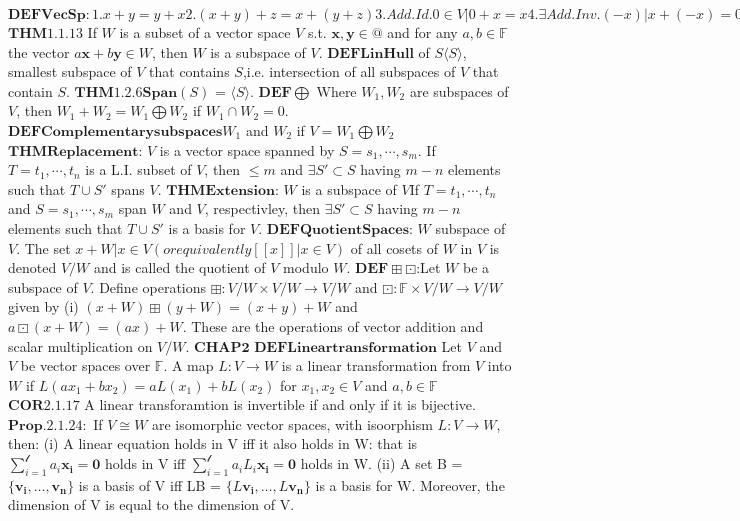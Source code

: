 \documentclass[8pt]{extarticle}
\theoremstyle{definition}
\begin{document}
{\small
$\mathbf{DEFVecSp}:1.x+y=y+x2.(x+y)+z = x+(y+z)3.Add.Id.0\in V | 0+x = x4. \exists Add.Inv. (-x) | x+(-x) = 0(5.) F.Dis.Law a(x+y) = ax + ay(6.) S.Dis.Law (a+b)(x) = ax + bx(7.)Mul.Id.1x=x(8.) (ab)x = a(bx)$
$\mathbf{THM1.1.13}$ If $W$ is a subset of a vector space $V$ s.t. $\mathbf{x,y} \in @$ and for any $a,b \in \mathbb{F} $ the vector $a \mathbf{x} + b \mathbf{y}  \in W$, then $W$ is a subspace of $V$.
$\mathbf{DEFLinHull}$ of $S \langle S \rangle$,  smallest subspace of $V$ that contains $S$,i.e. intersection of all subspaces of $V$ that contain $S$.
$\mathbf{THM1.2.6Span}(S)$ = $\langle S \rangle$.
$\mathbf{DEF}\bigoplus$ Where $W_1, W_2$ are subspaces of $V$, then $W_1 + W_2 = W_1 \bigoplus W_2 $ if $W_1 \cap W_2 = {0}.$
$\mathbf{DEF Complementary subspaces} W_1$ and $W_2$ if $V = W_1 \bigoplus W_2$
$\mathbf{THM Replacement}$: $V$ is a vector space spanned by $S = {s_1,\cdots,s_m}$. If $T = {t_1,\cdots,t_n}$ is a L.I. subset of $V$, then $\leq m$ and $\exists S' \subset S$ having $m-n$ elements such that $T\cup S'$ spans $V$.
$\mathbf{THM Extension}$: $W$ is a subspace of $V$If $T = {t_1,\cdots,t_n}$ and $S = {s_1,\cdots,s_m}$ span $W$ and $V$, respectivley, then $\exists S' \subset S$ having $m-n$ elements such that $T \cup S'$ is a basis for $V$.
$\mathbf{DEF Quotient Spaces}$: $W$ subspace of $V$. The set ${x+W | x \in V}(or equivalently [[ x ]] | x \in V)$ of all cosets of $W$ in $V$ is denoted $V/W$ and is called the quotient of $V$ modulo $W$.
$\mathbf{DEF} \boxplus \boxdot$:Let $W$ be a subspace of $V$. Define operations $\boxplus: V/W \times V/W \rightarrow V/W$ and $\boxdot : \mathbb{F} \times V/W \rightarrow V/W$ given by (i) $(x+W) \boxplus (y+W) = (x+y) + W$ and $a \boxdot(x+W) = (ax) + W$. These are the operations of vector addition and scalar multiplication on $V/W$.
$\mathbf{   CHAP2   } $
$\mathbf{DEF Linear transformation}$ Let $V$ and $V$ be vector spaces over $\mathbb{F} $. A map $L: V \rightarrow W$ is a linear transformation from $V$ into $W$ if $L(ax_1 + bx_2) = aL(x_1) + bL(x_2)$ for $x_1,x_2 \in V$ and $a,b \in \mathbb{F}$
$\mathbf{COR 2.1.17}$ A linear transforamtion is invertible if and only if it is bijective.
$\mathbf{Prop. 2.1.24: }$ If $V  \cong W$ are isomorphic vector spaces, with isoorphism $L:V \rightarrow W$, then: 
(i) A linear equation holds in V iff it also holds in W: that is $\sum_{i=1} ^\mathscr{l} a_i \mathbf{x_i} = \mathbf{0}$ holds in V iff $\sum_{i=1} ^\mathscr{l} a_i L_i \mathbf{x_i} = \mathbf{0}$ holds in W.
(ii) A set B = $\{\mathbf{v_i} ,\dots, \mathbf{ v_n}\}$ is a basis of V iff LB = $\{L\mathbf{v_i} ,\dots,L \mathbf{ v_n}\}$ is a basis for W. Moreover, the dimension of V is equal to the dimension of V.
}
\end{document}
